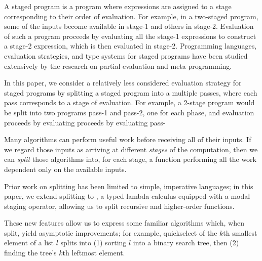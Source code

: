 A staged program is a program where expressions are assigned to a
stage corresponding to their order of evaluation.  For example, in a
two-staged program, some of the inputs become available in stage-1 and
others in stage-2.  Evaluation of such a program proceeds by
evaluating all the stage-1 expressions to construct a stage-2
expression, which is then evaluated in stage-2.  Programming
languages, evaluation strategies, and type systems for staged programs
have been studied extensively by the research on partial evaluation
and meta programming.

In this paper, we consider a relatively less considered evaluation
strategy for staged programs by splitting a staged program into a
multiple passes, where each pass corresponds to a stage of evaluation.
For example, a 2-stage program would be split into two programs pass-1
and pass-2, one for each phase, and evaluation proceeds by evaluating
proceeds by evaluating pass-


Many algorithms can perform useful work before receiving all of their inputs.
If we regard those inputs as arriving at different \emph{stages} of the
computation, then we can \emph{split} those algorithms into, for each stage, a
function performing all the work dependent only on the available inputs.

Prior work on splitting has been limited to simple, imperative languages; in
this paper, we extend splitting to \lang, a typed lambda calculus equipped with
a modal staging operator, allowing us to split recursive and higher-order
functions.

These new features allow us to express some familiar algorithms which, when
split, yield asymptotic improvements; for example, quickselect of the $k$th
smallest element of a list $l$ splits into (1) sorting $l$ into a binary search
tree, then (2) finding the tree's $k$th leftmost element.

